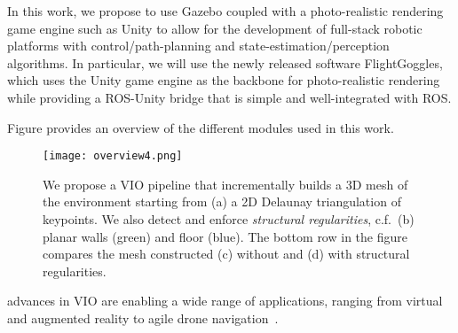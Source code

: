 In this work, we propose to use Gazebo coupled with a photo-realistic rendering game engine such as Unity to allow for the development of full-stack robotic platforms with control/path-planning and state-estimation/perception algorithms.
In particular, we will use the newly released software FlightGoggles, which uses the Unity game engine as the backbone for photo-realistic rendering while providing a ROS-Unity bridge that is simple and well-integrated with ROS.

Figure  provides an overview of the different modules used in this work.


\begin{figure}[t]
  \centering
  \texttt{[image: overview4.png]}
  \caption{We propose a VIO pipeline that incrementally builds a 3D mesh of the environment starting from (a) a 2D Delaunay triangulation of keypoints. We also detect and enforce \emph{structural regularities}, c.f.~(b) planar walls (green) and floor (blue). The bottom row in the figure compares the mesh constructed
  (c) without and (d) with structural regularities.\vspace{-5mm}}
  \label{fig:intro}
\end{figure}

  advances in VIO are enabling a wide range of applications, ranging from
 virtual and augmented reality to agile drone navigation~\cite{SayreMcCord18icra}.

